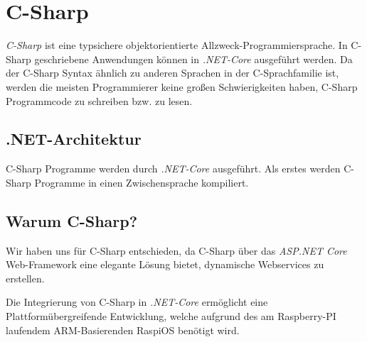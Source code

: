 \section{C-Sharp}
\label{C-Sharp}

\textit{C-Sharp} ist eine typsichere objektorientierte Allzweck-Programmiersprache.
In C-Sharp geschriebene Anwendungen können in \textit{.NET-Core} ausgeführt werden. 
Da der C-Sharp Syntax ähnlich zu anderen Sprachen in der C-Sprachfamilie ist, werden die meisten
Programmierer keine großen Schwierigkeiten haben, C-Sharp Programmcode zu schreiben bzw. zu lesen.  
\cite{csharpmicrosoft}

\subsection{.NET-Architektur}
C-Sharp Programme werden durch \textit{.NET-Core} ausgeführt. 
Als erstes werden C-Sharp Programme in einen Zwischensprache kompiliert.

\subsection{Warum C-Sharp?}
Wir haben uns für C-Sharp entschieden, da C-Sharp über das \textit{ASP.NET Core} Web-Framework eine elegante Lösung bietet, dynamische Webservices zu erstellen.

Die Integrierung von C-Sharp in \textit{.NET-Core} ermöglicht eine Plattformübergreifende Entwicklung, welche aufgrund des am Raspberry-PI laufendem ARM-Basierenden RaspiOS benötigt wird.